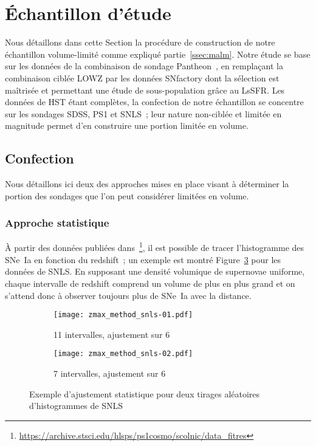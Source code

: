 \documentclass[../main/main.tex]{subfiles}
\begin{document}
\section{Échantillon d'étude}\label{sec:sample}

Nous détaillons dans cette Section la procédure de construction de notre
échantillon volume-limité comme expliqué partie~\ref{ssec:malm}. Notre étude se
base sur les données de la combinaison de sondage Pantheon~\citep{scolnic2018},
en remplaçant la combinaison ciblée LOWZ par les données SNfactory dont la
sélection est maîtrisée et permettant une étude de sous-population grâce au
LsSFR. Les données de HST étant complètes, la confection de notre échantillon se
concentre sur les sondages SDSS, PS1 et SNLS~; leur nature non-ciblée et limitée
en magnitude permet d'en construire une portion limitée en volume.

\subsection{Confection}\label{ssec:cuts}

Nous détaillons ici deux des approches mises en place visant à déterminer la
portion des sondages que l'on peut considérer limitées en volume.

\subsubsection{Approche statistique}\label{sssec:baserate}

À partir des données publiées dans~\cite{scolnic2018}\footnote{\href{
https://archive.stsci.edu/hlsps/ps1cosmo/scolnic/data_fitres/}
{https://archive.stsci.edu/hlsps/ps1cosmo/scolnic/data\_fitres}}, il est
possible de tracer l'histogramme des SNe~Ia en fonction du redshift~; un exemple
est montré Figure~\ref{fig:zmax_method} pour les données de SNLS. En supposant
une densité volumique de supernovae uniforme, chaque intervalle de redshift
comprend un volume de plus en plus grand et on s'attend donc à observer toujours
plus de SNe~Ia avec la distance.

\begin{figure}[]
    \centering
    \begin{subfigure}[]{.49\linewidth}
        \centering
        \texttt{[image: zmax\_method\_snls-01.pdf]}
        \captionsetup{justification=centering}
        \caption{11 intervalles, ajustement sur 6}
        \label{fig:zmax_method1}
    \end{subfigure}
    \begin{subfigure}[]{.49\linewidth}
        \centering
        \texttt{[image: zmax\_method\_snls-02.pdf]}
        \captionsetup{justification=centering}
        \caption{7 intervalles, ajustement sur 6}
        \label{fig:zmax_method2}
    \end{subfigure}
    \captionsetup{justification=centering}
    \caption{Exemple d'ajustement statistique pour deux tirages aléatoires
    d'histogrammes de SNLS}
    \label{fig:zmax_method}
\end{figure}
\end{document}

